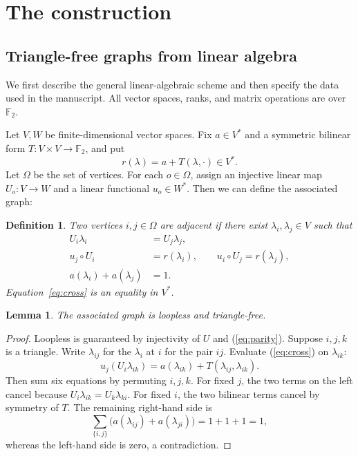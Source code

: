 \documentclass[11pt]{article}
\newtheorem{lemma}{Lemma}
\newtheorem{defn}[theorem]{Definition}
\begin{document}
\section{The construction}
\subsection{Triangle-free graphs from linear algebra}\label{sec:2.1}
We first describe the general linear-algebraic scheme and then specify the data used in the manuscript. All vector spaces, ranks, and matrix operations are over $\mathbb F_2$.

Let $V,W$ be finite-dimensional vector spaces. Fix $a\in V^*$ and a symmetric bilinear form $T:V\times V\to\mathbb F_2$, and put
\[
r(\lambda)=a+T(\lambda,\cdot)\in V^*.
\]
Let $\Omega$ be the set of vertices. For each $o\in\Omega$, assign an injective linear map $U_o:V\to W$ and a linear functional $u_o\in W^*$. Then we can define the associated graph:

\begin{defn}
Two vertices $i,j\in\Omega$ are adjacent if there exist $\lambda_i,\lambda_j\in V$ such that
\begin{align}
U_i\lambda_i&=U_j\lambda_j,\label{eq:shared}\\
u_j\circ U_i&=r(\lambda_i),\qquad u_i\circ U_j=r(\lambda_j),\label{eq:cross}\\
a(\lambda_i)+a(\lambda_j)&=1.\label{eq:parity}
\end{align}
Equation~\eqref{eq:cross} is an equality in $V^*$.
\end{defn}

\begin{lemma}
The associated graph is loopless and triangle-free.
\end{lemma}
\begin{proof}
	Loopless is guaranteed by injectivity of $U$ and (\ref{eq:parity}).
Suppose $i,j,k$ is a triangle. Write $\lambda_{ij}$ for the $\lambda_i$ at $i$ for the pair $ij$.  Evaluate (\ref{eq:cross}) on $\lambda_{ik}$:
\[
u_j(U_i \lambda_{ik})=a(\lambda_{ik})+T(\lambda_{ij},\lambda_{ik}).
\]
Then sum six equations by permuting $i,j,k$. For fixed $j$, the two terms on the left cancel because $U_i \lambda_{ik}=U_k \lambda_{ki}$. For fixed $i$, the two bilinear terms cancel by symmetry of $T$. The remaining right-hand side is
\[
\sum_{\{i,j\}}\bigl(a(\lambda_{ij})+a(\lambda_{ji})\bigr)=1+1+1=1,
\]
whereas the left-hand side is zero, a contradiction.


\end{proof}
\end{document}
